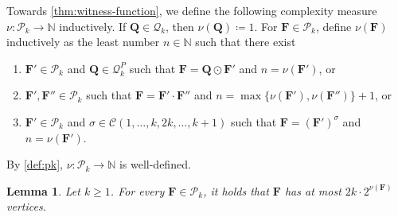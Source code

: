 \documentclass[a4paper,onecolumn,11pt,accepted=2026-01-06]{quantumarticle}
\theoremstyle{plain}
\newtheorem{lem}[thm]{Lemma}
\theoremstyle{remark}
\theoremstyle{definition}
\newcommand{\cyclicpermutations}{\mathscr{C}(1,\dots, k, 2k, \dots, k+1)}
\begin{document}
Towards \cref{thm:witness-function},
we define  the following complexity measure $\nu \colon \mathcal{P}_k \to \mathbb{N}$ inductively. If $\boldsymbol{Q} \in \mathcal{Q}_k$, then $\nu(\boldsymbol{Q}) \coloneqq 1$.
For $\boldsymbol{F} \in \mathcal{P}_k$, define $\nu(\boldsymbol{F})$ inductively as the least number $n \in \mathbb{N}$ such that there exist
\begin{enumerate}
	\item $\boldsymbol{F}' \in \mathcal{P}_k$ and $\boldsymbol{Q} \in \mathcal{Q}_k^P$ such that $\boldsymbol{F} = \boldsymbol{Q} \odot \boldsymbol{F}'$ and $n = \nu(\boldsymbol{F}')$, or
	\item $\boldsymbol{F}', \boldsymbol{F}'' \in \mathcal{P}_k$ such that $\boldsymbol{F} = \boldsymbol{F}' \cdot \boldsymbol{F}''$ and $n = \max\{ \nu(\boldsymbol{F}'), \nu(\boldsymbol{F}'')\} +1$, or
	\item $\boldsymbol{F}' \in \mathcal{P}_k$ and $\sigma \in \cyclicpermutations$ such that $\boldsymbol{F} = (\boldsymbol{F}')^\sigma$ and $n = \nu(\boldsymbol{F}')$.
\end{enumerate}
By \cref{def:pk}, $\nu \colon \mathcal{P}_k \to \mathbb{N}$ is well-defined.
\begin{lem} \label{lem:nu-size}
	Let $k \geq 1$.
	For every $\boldsymbol{F} \in \mathcal{P}_k$, it holds that $\boldsymbol{F}$ has at most $2k \cdot 2^{\nu(\boldsymbol{F})}$ vertices.
\end{lem}
\end{document}
